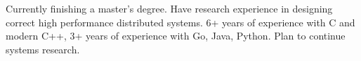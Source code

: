 

\begin{cvparagraph}

Currently finishing a master's degree. Have research experience in designing correct high performance distributed systems. 6+ years of experience with C and modern C++, 3+ years of experience with Go, Java, Python. Plan to continue systems research.
\end{cvparagraph}
